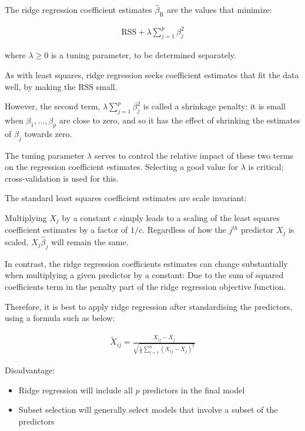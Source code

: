 The ridge regression coefficient estimates $\widehat{\beta}_{\text{R}}$ are the values that minimize:

\begin{align*}
    \text{RSS}+\lambda\sum_{j=1}^p \beta_j^2
\end{align*}

where $\lambda\geq 0$ is a tuning parameter, to be determined separately.

As with least squares, ridge regression seeks coefficient estimates that fit the data well, by making the RSS small.

However, the second term, $\lambda\sum_{j=1}^p \beta_j^2$ is called a shrinkage penalty: it is small when $\beta_1,\ldots,\beta_p$ are close to zero, and so it has the effect of shrinking the estimates of $\beta_j$ towards zero.

The tuning parameter $\lambda$ serves to control the relative impact of these two terms on the regression coefficient estimates. Selecting a good value for $\lambda$ is critical; cross-validation is used for this.

The standard least squares coefficient estimates are scale invariant:

Multiplying $X_j$ by a constant $c$ simply leads to a scaling of the least squares coefficient estimates by a factor of $1/c$. Regardless of how the $j^{th}$ predictor $X_j$ is scaled, $X_j\widehat{\beta}_j$ will remain the same.

In contrast, the ridge regression coefficients estimates can change substantially when multiplying a given predictor by a constant: Due to the sum of squared coefficients term in the penalty part of the ridge regression objective function.

Therefore, it is best to apply ridge regression after standardising the predictors, using a formula such as below:

\begin{align*}
    \tilde{X}_{ij} = \frac{X_{ij} - \bar{X}_j}{\sqrt{\frac{1}{n}\sum_{i=1}^n(X_{ij}-\bar{X}_j)^2}}
\end{align*}

\bigskip

Disadvantage:

\begin{itemize}
    \item Ridge regression will include all $p$ predictors in the final model
    \item Subset selection will generally select models that involve a subset of the predictors
\end{itemize}

